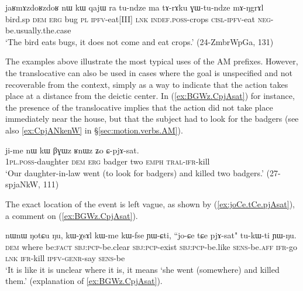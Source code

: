 \begin{exe}
\ex \label{ex:GWtundze.mANgrAl}
\gll  jaʁmɤzdoʁzdoʁ nɯ kɯ qajɯ ra tu-ndze ma tɤ-rɤku ɣɯ-tu-ndze mɤ-ŋgrɤl \\
bird.sp \textsc{dem} \textsc{erg} bug \textsc{pl} \textsc{ipfv}-eat[III] \textsc{lnk} \textsc{indef}.\textsc{poss}-crops \textsc{cisl}-\textsc{ipfv}-eat \textsc{neg}-be.usually.the.case \\
\glt `The bird  eats bugs, it does not come and eat crops.' (24-ZmbrWpGa, 131)
\end{exe}

The examples above illustrate the most typical uses of the AM prefixes. However, the translocative can also be used in cases where the goal is unspecified and not recoverable from the context, simply as a way to indicate that the action takes place at a distance from the deictic center. In (\ref{ex:BGWz.CpjAsat}) for instance, the presence of the translocative implies that the action did not take place immediately near the house, but that the subject had to look for the badgers (see also \ref{ex:CpjANkenW} in §\ref{sec:motion.verbs.AM}).

\begin{exe}
\ex  \label{ex:BGWz.CpjAsat}
 \gll  ji-me nɯ kɯ βɣɯz ʁnɯz ʑo ɕ-pjɤ-sat. \\
\textsc{1pl}.\textsc{poss}-daughter \textsc{dem} \textsc{erg} badger two \textsc{emph} \textsc{tral}-\textsc{ifr}-kill \\
\glt `Our daughter-in-law went (to look for badgers) and killed two badgers.' (27-spjaNkW, 111)
\end{exe}

The exact location of the event is left vague, as shown by  (\ref{ex:joCe.tCe.pjAsat}), a comment on (\ref{ex:BGWz.CpjAsat}).

\begin{exe}
\ex  \label{ex:joCe.tCe.pjAsat}
 \gll  nɯnɯ ŋotɕu ŋu, kɯ-χsɤl kɯ-me kɯ-fse ɲɯ-ɕti, ``jo-ɕe tɕe pjɤ-sat" tu-kɯ-ti ɲɯ-ŋu. \\
 \textsc{dem} where be:\textsc{fact} \textsc{sbj}:\textsc{pcp}-be.clear \textsc{sbj}:\textsc{pcp}-exist   \textsc{sbj}:\textsc{pcp}-be.like \textsc{sens}-be.\textsc{aff} \textsc{ifr}-go \textsc{lnk} \textsc{ifr}-kill \textsc{ipfv}-\textsc{genr}-say \textsc{sens}-be \\
 \glt `It is like it is unclear where it is, it means `she went (somewhere) and killed them.' (explanation of \ref{ex:BGWz.CpjAsat}).
\end{exe}

